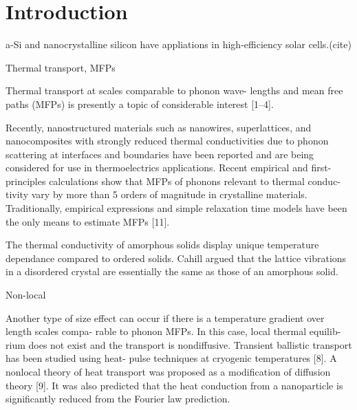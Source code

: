 \documentclass[aps,prb,twocolumn,superscriptaddress,footinbib,amsmath,amssymb,floatfix]{revtex4}
\begin{document}
\section{\label{S:Introduction}Introduction}

a-Si and nanocrystalline silicon have appliations in high-efficiency 
solar cells.(cite)

Thermal transport, MFPs

Thermal transport at scales comparable to phonon wave-
lengths and mean free paths (MFPs) is presently a topic of
considerable interest [1–4].\cite{cahill_nanoscale_2003,
yu_reduction_2010,hochbaum_enhanced_2008,pernot_precise_2010}

Recently, nanostructured materials
such as nanowires, superlattices, and nanocomposites with
strongly reduced thermal conductivities due to phonon
scattering at interfaces and boundaries have been reported
and are being considered for use in thermoelectrics applications.
\cite{hochbaum_enhanced_2008,pernot_precise_2010,
boukai_silicon_2008,poudel_high-thermoelectric_2008}
Recent empirical and first-principles calculations
show that MFPs of phonons relevant to thermal conduc-
tivity vary by more than 5 orders of magnitude in crystalline 
materials.\cite{ward_intrinsic_2010}
Traditionally, empirical expressions and
simple relaxation time models have been the only means
to estimate MFPs [11].\cite{holland_analysis_1963} 

The thermal conductivity of amorphous solids display 
unique temperature dependance compared to ordered solids.
\cite{freeman_thermal_1986} 
Cahill argued that the lattice vibrations 
in a disordered crystal are essentially the same as those of an 
amorphous solid.\cite{cahill_lower_1992} 

Non-local

Another type of size effect can occur if
there is a temperature gradient over length scales compa-
rable to phonon MFPs. In this case, local thermal equilib-
rium does not exist and the transport is nondiffusive.
Transient ballistic transport has been studied using heat-
pulse techniques at cryogenic temperatures [8].
\cite{von-Gutfeld_heat_1964} 
A nonlocal
theory of heat transport was proposed as a modification of
diffusion theory [9].\cite{mahan_nonlocal_1988} 
It was also predicted that the heat
conduction from a nanoparticle is significantly reduced
from the Fourier law prediction.\cite{chen_particularities_2000}
\end{document}
